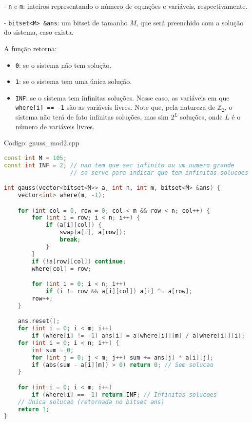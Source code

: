 \documentclass[10pt, a4paper, oneside]{book}
\begin{document}
 - \texttt{n} e \texttt{m}: inteiros representando o número de equações e variáveis, respectivamente.

 - \texttt{bitset<M> \&ans}: um bitset de tamanho $M$, que será preenchido com a solução do sistema, caso exista.



A função retorna:

\begin{itemize}
\item \texttt{0}: se o sistema não tem solução.
\item \texttt{1}: se o sistema tem uma única solução.
\item \texttt{INF}: se o sistema tem infinitas soluções. Nesse caso, as variáveis em que \texttt{where[i] == -1} são as variáveis livres. Note que, pela natureza de $\mathbb{Z}_2$, o sistema não terá de fato infinitas soluções, mas sim $2^L$ soluções, onde $L$ é o número de variáveis livres.
\end{itemize}

\hfill

Codigo: gauss\_mod2.cpp

\begin{lstlisting}[language=C++]
const int M = 105;
const int INF = 2; // nao tem que ser infinito ou um numero grande
                   // so serve para indicar que tem infinitas solucoes

int gauss(vector<bitset<M>> a, int n, int m, bitset<M> &ans) {
    vector<int> where(m, -1);

    for (int col = 0, row = 0; col < m && row < n; col++) {
        for (int i = row; i < n; i++) {
            if (a[i][col]) {
                swap(a[i], a[row]);
                break;
            }
        }
        if (!a[row][col]) continue;
        where[col] = row;

        for (int i = 0; i < n; i++)
            if (i != row && a[i][col]) a[i] ^= a[row];
        row++;
    }

    ans.reset();
    for (int i = 0; i < m; i++)
        if (where[i] != -1) ans[i] = a[where[i]][m] / a[where[i]][i];
    for (int i = 0; i < n; i++) {
        int sum = 0;
        for (int j = 0; j < m; j++) sum += ans[j] * a[i][j];
        if (abs(sum - a[i][m]) > 0) return 0; // Sem solucao
    }

    for (int i = 0; i < m; i++)
        if (where[i] == -1) return INF; // Infinitas solucoes
    // Unica solucao (retornada no bitset ans)
    return 1;
}
\end{lstlisting}
\hfill
\end{document}
